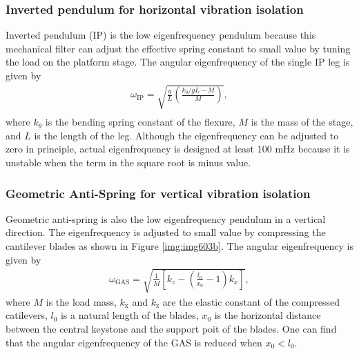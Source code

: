 \subsubsection{Inverted pendulum for horizontal vibration isolation}
Inverted pendulum (IP) is the low eigenfrequency pendulum because this mechanical filter can adjust the effective spring constant to small value by tuning the load on the platform stage. The angular eigenfrequency of the single IP leg is given by \cite{sekiguchi2016astudy}
\begin{eqnarray}
  \omega_{\mathrm{IP}}=\sqrt{\frac{g}{L}\left(\frac{k_{\mathrm{\theta}}/gL-M}{M}\right)},\\
\end{eqnarray}
where $k_{\theta}$ is the bending spring constant of the flexure, $M$ is the mass of the stage, and $L$ is the length of the leg. Although the eigenfrequency can be adjusted to zero in principle, actual eigenfrequency is designed at least 100 mHz because it is unstable when the term in the square root is minus value.

\subsubsection{Geometric Anti-Spring for vertical vibration isolation}
Geometric anti-spring is also the low eigenfrequency pendulum in a vertical direction. The eigenfrequency is adjusted to small value by compressing the cantilever blades as shown in Figure \ref{img:img603b}. The angular eigenfrequency is given by 
\begin{eqnarray}
  \omega_{\mathrm{GAS}} = \sqrt{\frac{1}{M}\left[{ k_{z}- \left(\frac{l_{0}}{x_{0}}-1\right) k_{x}}\right]},
\end{eqnarray}
where $M$ is the load mass, $k_{\mathrm{x}}$ and $k_{\mathrm{z}}$ are the elastic constant of the compressed catilevers, $l_{0}$ is a natural length of the blades, $x_0$ is the horizontal distance between the central keystone and the support poit of the blades. One can find that the angular eigenfrequency of the GAS is reduced when $x_{0}<l_{0}$.

